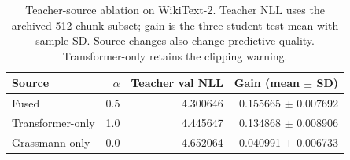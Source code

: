 \begin{table}[htbp]
\centering\small
\begin{tabular}{lrrr}
\toprule
Source & $\alpha$ & Teacher val NLL & Gain (mean $\pm$ SD) \\
\midrule
Fused & 0.5 & 4.300646 & 0.155665 $\pm$ 0.007692 \\
Transformer-only & 1.0 & 4.445647 & 0.134868 $\pm$ 0.008906 \\
Grassmann-only & 0.0 & 4.652064 & 0.040991 $\pm$ 0.006733 \\
\bottomrule
\end{tabular}
\caption{Teacher-source ablation on WikiText-2. Teacher NLL uses the archived 512-chunk subset; gain is the three-student test mean with sample SD. Source changes also change predictive quality. Transformer-only retains the clipping warning.}
\label{tab:teacher_sources}
\end{table}
